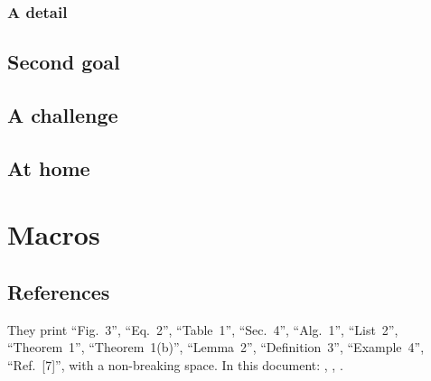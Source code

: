\documentclass[11pt]{amsart}         %
\begin{document}
\subsubsection{A detail}
\subsection{Second goal}



\hSectionChallenge
\subsection{A challenge}



\hSectionHome
\subsection{At home}




\hNumbersArabic
\section{Macros}

\subsection{References}

\begin{texcode}
          
        
\end{texcode}

They print ``Fig.~3'', ``Eq.~2'', ``Table~1'', ``Sec.~4'', ``Alg.~1'', ``List~2'',
``Theorem~1'', ``Theorem~1(b)'', ``Lemma~2'', ``Definition~3'', ``Example~4'', ``Ref.~[7]'',
with a non-breaking space. In this document:
, , .


\end{document}
